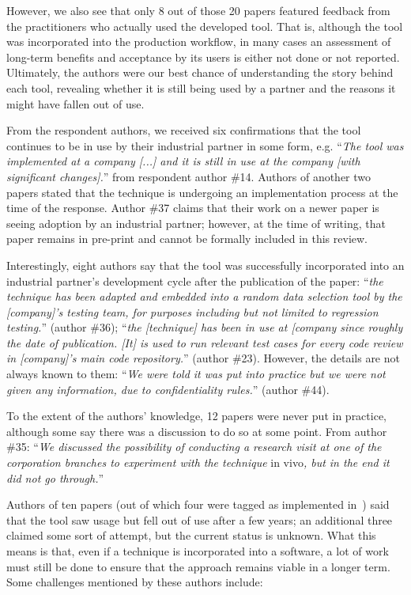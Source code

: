 However, we also see that only 8 out of those 20 papers featured feedback from the practitioners who actually used the developed tool.
That is, although the tool was incorporated into the production workflow, in many cases an assessment of long-term benefits and acceptance by its users is either not done or not reported.
%
Ultimately, the authors were our best chance of understanding the story behind each tool, revealing whether it is still being used by a partner and the reasons it might have fallen out of use.

From the respondent authors, we received six confirmations that the tool continues to be in use by their industrial partner in some form, e.g. ``\textit{The tool was implemented at a company [...] and it is still in use at the company [with significant changes].}'' from respondent author \#14.
Authors of another two papers stated that the technique is undergoing an implementation process at the time of the response.
Author \#37 claims that their work on a newer paper is seeing adoption by an industrial partner; however, at the time of writing, that paper remains in pre-print and cannot be formally included in this review.

Interestingly, eight authors say that the tool was successfully incorporated into an industrial partner's development cycle after the publication of the paper: ``\textit{the technique has been adapted and embedded into a random data selection tool by the [company]’s testing team, for purposes including but not limited to regression testing.}'' (author \#36); ``\textit{the [technique] has been in use at [company since roughly the date of publication. [It] is used to run relevant test cases for every code review in [company]'s main code repository.}'' (author \#23).
However, the details are not always known to them: ``\textit{We were told it was put into practice but we were not given any information, due to confidentiality rules.}'' (author \#44).

To the extent of the authors' knowledge, 12 papers were never put in practice, although some say there was a discussion to do so at some point.
From author \#35: ``\textit{We discussed the possibility of conducting a research visit at one of the corporation branches to experiment with the technique} in vivo\textit{, but in the end it did not go through.}''

Authors of ten papers (out of which four were tagged as implemented in~) said that the tool saw usage but fell out of use after a few years; an additional three claimed some sort of attempt, but the current status is unknown.
What this means is that, even if a technique is incorporated into a software, a lot of work must still be done to ensure that the approach remains viable in a longer term.
Some challenges mentioned by these authors include:

